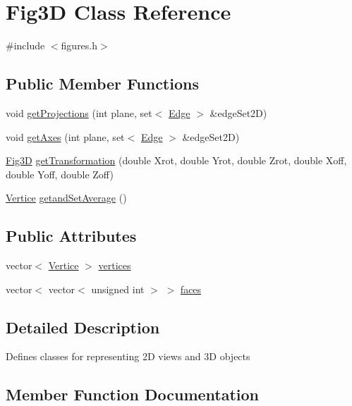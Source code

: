 \hypertarget{classFig3D}{}\section{Fig3D Class Reference}
\label{classFig3D}


{\ttfamily \#include $<$figures.\+h$>$}

\subsection*{Public Member Functions}
\begin{DoxyCompactItemize}
\item 
void \hyperlink{classFig3D_af1000067e4e230b41059896c8cacd4e1}{get\+Projections} (int plane, set$<$ \hyperlink{structEdge}{Edge} $>$ \&edge\+Set2D)
\item 
void \hyperlink{classFig3D_a4fbcfab626ef2fe938bc53dec4c0543a}{get\+Axes} (int plane, set$<$ \hyperlink{structEdge}{Edge} $>$ \&edge\+Set2D)
\item 
\hyperlink{classFig3D}{Fig3D} \hyperlink{classFig3D_a25a3607c2735064d0bc0081b271ea224}{get\+Transformation} (double Xrot, double Yrot, double Zrot, double Xoff, double Yoff, double Zoff)
\item 
\hyperlink{structVertice}{Vertice} \hyperlink{classFig3D_a62f775900f836f70e0c5fe157079ca9d}{getand\+Set\+Average} ()
\end{DoxyCompactItemize}
\subsection*{Public Attributes}
\begin{DoxyCompactItemize}
\item 
vector$<$ \hyperlink{structVertice}{Vertice} $>$ \hyperlink{classFig3D_a3d00aa545805c0c04563055cc183cbb9}{vertices}
\item 
vector$<$ vector$<$ unsigned int $>$ $>$ \hyperlink{classFig3D_abd9f97ce3404190fd202b12885d56fe3}{faces}
\end{DoxyCompactItemize}


\subsection{Detailed Description}
Defines classes for representing 2D views and 3D objects 

\subsection{Member Function Documentation}
\mbox{\label{classFig3D_a62f775900f836f70e0c5fe157079ca9d}} 
